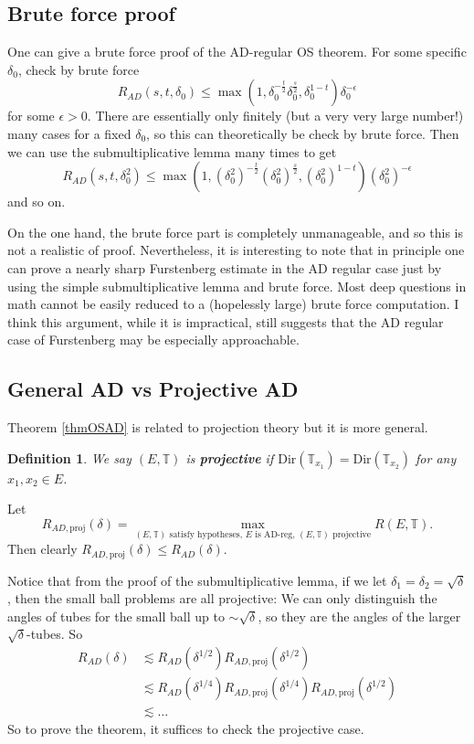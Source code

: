 \documentclass[12pt]{amsart}
\newtheorem{Definition}[theorem]{Definition}
\begin{document}
\subsection{Brute force proof}
One can give a brute force proof of the AD-regular OS theorem. For some specific $\delta_0$, check by brute force
\[
    R_{AD}(s, t, \delta_0) \leq \max(1, \delta_0^{-\frac{t}{2}} \delta_0^{\frac{s}{2}}, \delta_0^{1 - t}) \delta_0^{-\epsilon}
\]
for some $\epsilon > 0$. There are essentially only finitely (but a very very large number!) many cases for a fixed $\delta_0$, so this can theoretically be check by brute force. Then we can use the submultiplicative lemma many times to get
\[
    R_{AD}(s, t, \delta_0^2) \leq \max(1, (\delta_0^2)^{-\frac{t}{2}} (\delta_0^2)^{\frac{s}{2}}, (\delta_0^2)^{1 - t}) (\delta_0^2)^{-\epsilon}
\]
and so on.

On the one hand,  the brute force part is completely unmanageable,  and so this is not a realistic of proof.   Nevertheless,  it is interesting to note that in principle one can prove a nearly sharp Furstenberg estimate in the AD regular case just by using the simple submultiplicative lemma and brute force.  Most deep questions in math cannot be easily reduced to a (hopelessly large) brute force computation.   I think this argument,  while it is impractical, still suggests that the AD regular case of Furstenberg may be especially approachable.

\subsection{General AD vs Projective AD}

Theorem \ref{thmOSAD} is related to projection theory but it is more general.  

\begin{Definition}
    We say $(E, \mathbb{T})$ is \textbf{projective} if $\mathrm{Dir}(\mathbb{T}_{x_1}) = \mathrm{Dir}(\mathbb{T}_{x_2})$ for any $x_1, x_2 \in E$.
\end{Definition}
Let
\[
    R_{AD, \mathrm{proj}}(\delta) = \max_{\text{$(E, \mathbb{T})$ satisfy hypotheses, $E$ is AD-reg, $(E, \mathbb{T})$ projective}} R(E, \mathbb{T}).
\]
Then clearly $R_{AD, \mathrm{proj}}(\delta) \leq R_{AD}(\delta)$.

Notice that from the proof of the submultiplicative lemma, if we let $\delta_1 = \delta_2 = \sqrt{\delta}$, then the small ball problems are all projective: We can only distinguish the angles of tubes for the small ball up to $\sim \sqrt{\delta}$, so they are the angles of the larger $\sqrt{\delta}$-tubes. So
\begin{align*}
    R_{AD}(\delta) & \lesssim R_{AD}(\delta^{1/2}) R_{AD, \mathrm{proj}}(\delta^{1/2}) \\
    & \lesssim R_{AD}(\delta^{1/4}) R_{AD, \mathrm{proj}}(\delta^{1/4}) R_{AD, \mathrm{proj}}(\delta^{1/2}) \\
    & \lesssim \ldots
\end{align*}
So to prove the theorem, it suffices to check the projective case. 
\end{document}
